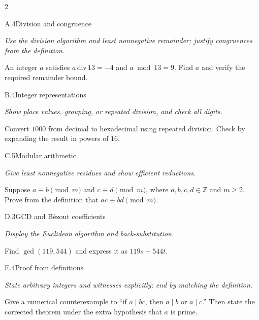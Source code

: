 \documentclass[9pt]{extarticle}
\begin{document}
\begin{multicols}{2}
\begin{CoreProblem}{A.4}{Division and congruence}
{\scriptsize\textit{Use the division algorithm and least nonnegative remainder; justify congruences from the definition.}\par}
An integer $a$ satisfies $a\,\mathrm{div}\,13=-4$ and $a\bmod13=9$.
Find $a$ and verify the required remainder bound.
\end{CoreProblem}
\begin{CoreProblem}{B.4}{Integer representations}
{\scriptsize\textit{Show place values, grouping, or repeated division, and check all digits.}\par}
Convert $1000$ from decimal to hexadecimal using repeated division. Check by
expanding the result in powers of $16$.
\end{CoreProblem}
\begin{CoreProblem}{C.5}{Modular arithmetic}
{\scriptsize\textit{Give least nonnegative residues and show efficient reductions.}\par}
Suppose $a\equiv b\pmod m$ and $c\equiv d\pmod m$, where
$a,b,c,d\in\mathbb Z$ and $m\ge2$. Prove from the definition that
$ac\equiv bd\pmod m$.
\end{CoreProblem}
\columnbreak
\begin{CoreProblem}{D.3}{GCD and B\'ezout coefficients}
{\scriptsize\textit{Display the Euclidean algorithm and back-substitution.}\par}
Find $\gcd(119,544)$ and express it as $119s+544t$.
\end{CoreProblem}
\begin{CoreProblem}{E.4}{Proof from definitions}
{\scriptsize\textit{State arbitrary integers and witnesses explicitly; end by matching the definition.}\par}
Give a numerical counterexample to ``if $a\mid bc$, then $a\mid b$ or
$a\mid c$.'' Then state the corrected theorem under the extra hypothesis that
$a$ is prime.
\end{CoreProblem}
\end{multicols}
\CoreWorkArea
\FormBreak
{}
\end{document}
